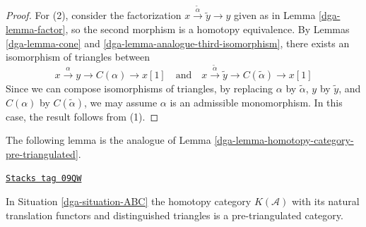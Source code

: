 \begin{proof}
\medskip\noindent
For (2), consider the factorization
$x\xrightarrow{\tilde{\alpha}}\tilde{y}\to y$
given as in Lemma \ref{dga-lemma-factor}, so the second morphism
is a homotopy equivalence. By Lemmas \ref{dga-lemma-cone} and
\ref{dga-lemma-analogue-third-isomorphism}, there
exists an isomorphism of triangles between
$$
x \xrightarrow{\alpha} y \to C(\alpha) \to x[1]
\quad\text{and}\quad
x \xrightarrow{\tilde{\alpha}} \tilde{y} \to C(\tilde{\alpha}) \to x[1]
$$
Since we can compose isomorphisms of triangles, by replacing
$\alpha$ by $\tilde{\alpha}$, $y$ by $\tilde{y}$, and $C(\alpha)$ by
$C(\tilde{\alpha})$, we may assume $\alpha$ is an admissible monomorphism.
In this case, the result follows from (1).
\end{proof}

The following lemma is the analogue of
Lemma \ref{dga-lemma-homotopy-category-pre-triangulated}.

\begin{lemma}
\label{dga-lemma-analogue-homotopy-category-pre-triangulated}
\href{https://stacks.math.columbia.edu/tag/09QW}{\texttt{Stacks tag 09QW}}

In Situation \ref{dga-situation-ABC} the homotopy category $K(\mathcal{A})$
with its natural translation functors and distinguished triangles
is a pre-triangulated category.
\end{lemma}

